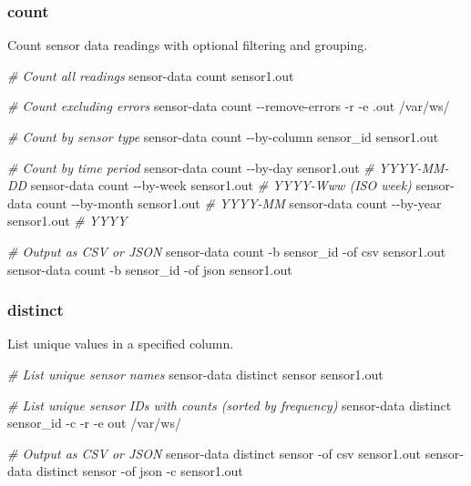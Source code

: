 \documentclass[
]{book}
\newenvironment{Shaded}{\begin{snugshade}}{\end{snugshade}}
\newcommand{\AttributeTok}[1]{\textcolor[rgb]{0.13,0.29,0.53}{#1}}
\newcommand{\CommentTok}[1]{\textcolor[rgb]{0.56,0.35,0.01}{\textit{#1}}}
\newcommand{\ExtensionTok}[1]{#1}
\newcommand{\NormalTok}[1]{#1}
\begin{document}
\subsubsection{count}\label{count}

Count sensor data readings with optional filtering and grouping.

\begin{Shaded}
\begin{Highlighting}[]
\CommentTok{\# Count all readings}
\ExtensionTok{sensor{-}data}\NormalTok{ count sensor1.out}

\CommentTok{\# Count excluding errors}
\ExtensionTok{sensor{-}data}\NormalTok{ count }\AttributeTok{{-}{-}remove{-}errors} \AttributeTok{{-}r} \AttributeTok{{-}e}\NormalTok{ .out /var/ws/}

\CommentTok{\# Count by sensor type}
\ExtensionTok{sensor{-}data}\NormalTok{ count }\AttributeTok{{-}{-}by{-}column}\NormalTok{ sensor\_id sensor1.out}

\CommentTok{\# Count by time period}
\ExtensionTok{sensor{-}data}\NormalTok{ count }\AttributeTok{{-}{-}by{-}day}\NormalTok{ sensor1.out      }\CommentTok{\# YYYY{-}MM{-}DD}
\ExtensionTok{sensor{-}data}\NormalTok{ count }\AttributeTok{{-}{-}by{-}week}\NormalTok{ sensor1.out     }\CommentTok{\# YYYY{-}Www (ISO week)}
\ExtensionTok{sensor{-}data}\NormalTok{ count }\AttributeTok{{-}{-}by{-}month}\NormalTok{ sensor1.out    }\CommentTok{\# YYYY{-}MM}
\ExtensionTok{sensor{-}data}\NormalTok{ count }\AttributeTok{{-}{-}by{-}year}\NormalTok{ sensor1.out     }\CommentTok{\# YYYY}

\CommentTok{\# Output as CSV or JSON}
\ExtensionTok{sensor{-}data}\NormalTok{ count }\AttributeTok{{-}b}\NormalTok{ sensor\_id }\AttributeTok{{-}of}\NormalTok{ csv sensor1.out}
\ExtensionTok{sensor{-}data}\NormalTok{ count }\AttributeTok{{-}b}\NormalTok{ sensor\_id }\AttributeTok{{-}of}\NormalTok{ json sensor1.out}
\end{Highlighting}
\end{Shaded}

\subsubsection{distinct}\label{distinct}

List unique values in a specified column.

\begin{Shaded}
\begin{Highlighting}[]
\CommentTok{\# List unique sensor names}
\ExtensionTok{sensor{-}data}\NormalTok{ distinct sensor sensor1.out}

\CommentTok{\# List unique sensor IDs with counts (sorted by frequency)}
\ExtensionTok{sensor{-}data}\NormalTok{ distinct sensor\_id }\AttributeTok{{-}c} \AttributeTok{{-}r} \AttributeTok{{-}e}\NormalTok{ out /var/ws/}

\CommentTok{\# Output as CSV or JSON}
\ExtensionTok{sensor{-}data}\NormalTok{ distinct sensor }\AttributeTok{{-}of}\NormalTok{ csv sensor1.out}
\ExtensionTok{sensor{-}data}\NormalTok{ distinct sensor }\AttributeTok{{-}of}\NormalTok{ json }\AttributeTok{{-}c}\NormalTok{ sensor1.out}
\end{Highlighting}
\end{Shaded}
\end{document}
